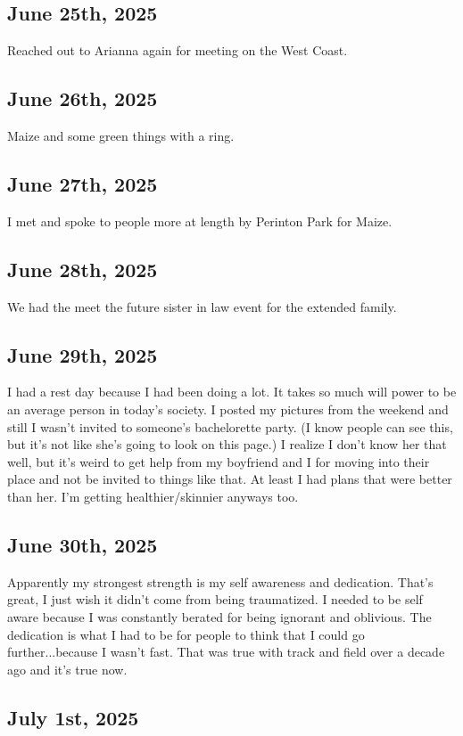 \documentclass{article}
\begin{document}
\subsection{June 25th, 2025}
Reached out to Arianna again for meeting on the West Coast. 

\subsection{June 26th, 2025}
Maize and some green things with a ring. 

\subsection{June 27th, 2025}
I met and spoke to people more at length by Perinton Park for Maize. 

\subsection{June 28th, 2025}
We had the meet the future sister in law event for the extended family. 

\subsection{June 29th, 2025}
I had a rest day because I had been doing a lot. It takes so much will power to be an average person in today's society. I posted my pictures from the weekend and still I wasn't invited to someone's bachelorette party. (I know people can see this, but it's not like she's going to look on this page.) I realize I don't know her that well, but it's weird to get help from my boyfriend and I for moving into their place and not be invited to things like that. At least I had plans that were better than her. I'm getting healthier/skinnier anyways too. 

\subsection{June 30th, 2025}
Apparently my strongest strength is my self awareness and dedication. That's great, I just wish it didn't come from being traumatized. I needed to be self aware because I was constantly berated for being ignorant and oblivious. The dedication is what I had to be for people to think that I could go further...because I wasn't fast. That was true with track and field over a decade ago and it's true now. 


\subsection{July 1st, 2025}
\end{document}
